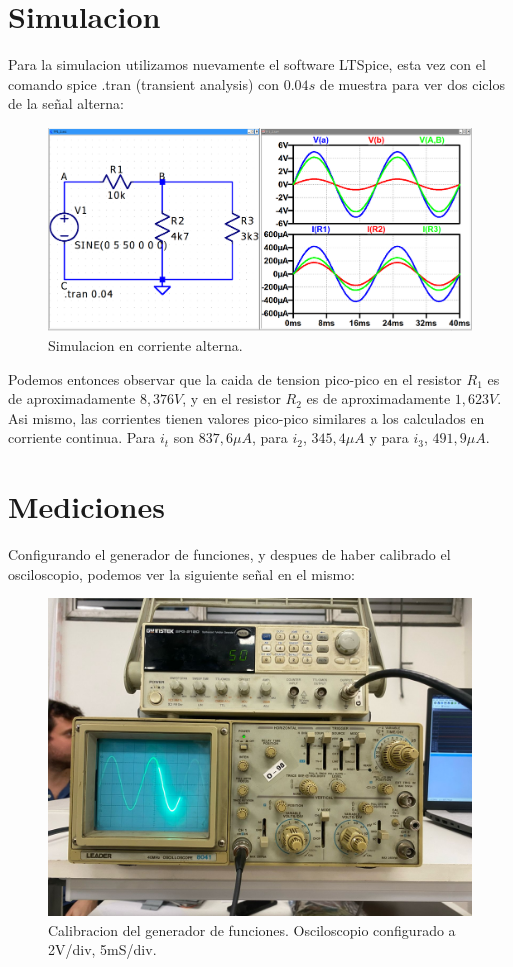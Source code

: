 \documentclass[a4paper,12pt, spanish]{report}
\begin{document}
      \section{Simulacion}
      Para la simulacion utilizamos nuevamente el software LTSpice, esta vez con el comando spice .tran (transient
      analysis) con $0.04s$ de muestra para ver dos ciclos de la señal alterna:
      \begin{figure}[!h]
        \centering
        \includegraphics[width=1\linewidth]{images/sim_ac.png}
        \caption{Simulacion en corriente alterna.}
      \end{figure}

      Podemos entonces observar que la caida de tension pico-pico en el resistor $R_1$ es de aproximadamente $8,376V$,
      y en el resistor $R_2$ es de aproximadamente $1,623V$. Asi mismo, las corrientes tienen valores pico-pico
      similares a los calculados en corriente continua. Para $i_t$ son $837,6\mu A$, para $i_2$, $345,4\mu A$ y para
      $i_3$, $491,9\mu A$.

      \newpage
      \section{Mediciones}
      Configurando el generador de funciones, y despues de haber calibrado el osciloscopio, podemos ver la siguiente
      señal en el mismo:
      \begin{figure}[!h]
        \centering
        \includegraphics[width=0.8\linewidth]{pictures/osc-ac_vs.jpeg}
        \caption{Calibracion del generador de funciones. Osciloscopio configurado a 2V/div, 5mS/div.}
      \end{figure}
\end{document}
